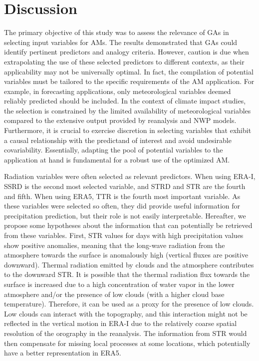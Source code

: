 \documentclass[draft]{agujournal2019}
\begin{document}
\section{Discussion}
\label{discussion}

The primary objective of this study was to assess the relevance of GAs in selecting input variables for AMs. The results demonstrated that GAs could identify pertinent predictors and analogy criteria. However, caution is due when extrapolating the use of these selected predictors to different contexts, as their applicability may not be universally optimal. In fact, the compilation of potential variables must be tailored to the specific requirements of the AM application. For example, in forecasting applications, only meteorological variables deemed reliably predicted should be included. In the context of climate impact studies, the selection is constrained by the limited availability of meteorological variables compared to the extensive output provided by reanalysis and NWP models. Furthermore, it is crucial to exercise discretion in selecting variables that exhibit a causal relationship with the predictand of interest and avoid undesirable covariability. Essentially, adapting the pool of potential variables to the application at hand is fundamental for a robust use of the optimized AM.

Radiation variables were often selected as relevant predictors. When using ERA-I, SSRD is the second most selected variable, and STRD and STR are the fourth and fifth. When using ERA5, TTR is the fourth most important variable. As these variables were selected so often, they did provide useful information for precipitation prediction, but their role is not easily interpretable. Hereafter, we propose some hypotheses about the information that can potentially be retrieved from these variables. First, STR values for days with high precipitation values show positive anomalies, meaning that the long-wave radiation from the atmosphere towards the surface is anomalously high (vertical fluxes are positive downward). Thermal radiation emitted by clouds and the atmosphere contributes to the downward STR. It is possible that the thermal radiation flux towards the surface is increased due to a high concentration of water vapor in the lower atmosphere and/or the presence of low clouds (with a higher cloud base temperature). Therefore, it can be used as a proxy for the presence of low clouds. Low clouds can interact with the topography, and this interaction might not be reflected in the vertical motion in ERA-I due to the relatively coarse spatial resolution of the orography in the reanalysis. The information from STR would then compensate for missing local processes at some locations, which potentially have a better representation in ERA5.
\end{document}
